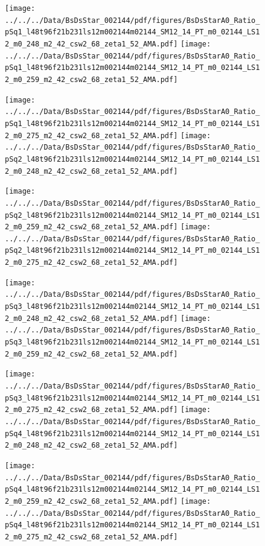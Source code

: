 \documentclass[a4paper,10pt]{article}
\begin{document}
\begin{figure}[p]
 \texttt{[image: ../../../Data/BsDsStar\_002144/pdf/figures/BsDsStarA0\_Ratio\_pSq1\_l48t96f21b231ls12m002144m02144\_SM12\_14\_PT\_m0\_02144\_LS12\_m0\_248\_m2\_42\_csw2\_68\_zeta1\_52\_AMA.pdf]} 
 \texttt{[image: ../../../Data/BsDsStar\_002144/pdf/figures/BsDsStarA0\_Ratio\_pSq1\_l48t96f21b231ls12m002144m02144\_SM12\_14\_PT\_m0\_02144\_LS12\_m0\_259\_m2\_42\_csw2\_68\_zeta1\_52\_AMA.pdf]} 
 \end{figure}
\begin{figure}[p]
 \texttt{[image: ../../../Data/BsDsStar\_002144/pdf/figures/BsDsStarA0\_Ratio\_pSq1\_l48t96f21b231ls12m002144m02144\_SM12\_14\_PT\_m0\_02144\_LS12\_m0\_275\_m2\_42\_csw2\_68\_zeta1\_52\_AMA.pdf]} 
 \texttt{[image: ../../../Data/BsDsStar\_002144/pdf/figures/BsDsStarA0\_Ratio\_pSq2\_l48t96f21b231ls12m002144m02144\_SM12\_14\_PT\_m0\_02144\_LS12\_m0\_248\_m2\_42\_csw2\_68\_zeta1\_52\_AMA.pdf]} 
 \end{figure}
\begin{figure}[p]
 \texttt{[image: ../../../Data/BsDsStar\_002144/pdf/figures/BsDsStarA0\_Ratio\_pSq2\_l48t96f21b231ls12m002144m02144\_SM12\_14\_PT\_m0\_02144\_LS12\_m0\_259\_m2\_42\_csw2\_68\_zeta1\_52\_AMA.pdf]} 
 \texttt{[image: ../../../Data/BsDsStar\_002144/pdf/figures/BsDsStarA0\_Ratio\_pSq2\_l48t96f21b231ls12m002144m02144\_SM12\_14\_PT\_m0\_02144\_LS12\_m0\_275\_m2\_42\_csw2\_68\_zeta1\_52\_AMA.pdf]} 
 \end{figure}
\clearpage
\begin{figure}[p]
 \texttt{[image: ../../../Data/BsDsStar\_002144/pdf/figures/BsDsStarA0\_Ratio\_pSq3\_l48t96f21b231ls12m002144m02144\_SM12\_14\_PT\_m0\_02144\_LS12\_m0\_248\_m2\_42\_csw2\_68\_zeta1\_52\_AMA.pdf]} 
 \texttt{[image: ../../../Data/BsDsStar\_002144/pdf/figures/BsDsStarA0\_Ratio\_pSq3\_l48t96f21b231ls12m002144m02144\_SM12\_14\_PT\_m0\_02144\_LS12\_m0\_259\_m2\_42\_csw2\_68\_zeta1\_52\_AMA.pdf]} 
 \end{figure}
\begin{figure}[p]
 \texttt{[image: ../../../Data/BsDsStar\_002144/pdf/figures/BsDsStarA0\_Ratio\_pSq3\_l48t96f21b231ls12m002144m02144\_SM12\_14\_PT\_m0\_02144\_LS12\_m0\_275\_m2\_42\_csw2\_68\_zeta1\_52\_AMA.pdf]} 
 \texttt{[image: ../../../Data/BsDsStar\_002144/pdf/figures/BsDsStarA0\_Ratio\_pSq4\_l48t96f21b231ls12m002144m02144\_SM12\_14\_PT\_m0\_02144\_LS12\_m0\_248\_m2\_42\_csw2\_68\_zeta1\_52\_AMA.pdf]} 
 \end{figure}
\begin{figure}[p]
 \texttt{[image: ../../../Data/BsDsStar\_002144/pdf/figures/BsDsStarA0\_Ratio\_pSq4\_l48t96f21b231ls12m002144m02144\_SM12\_14\_PT\_m0\_02144\_LS12\_m0\_259\_m2\_42\_csw2\_68\_zeta1\_52\_AMA.pdf]} 
 \texttt{[image: ../../../Data/BsDsStar\_002144/pdf/figures/BsDsStarA0\_Ratio\_pSq4\_l48t96f21b231ls12m002144m02144\_SM12\_14\_PT\_m0\_02144\_LS12\_m0\_275\_m2\_42\_csw2\_68\_zeta1\_52\_AMA.pdf]} 
 \end{figure}
\end{document}
